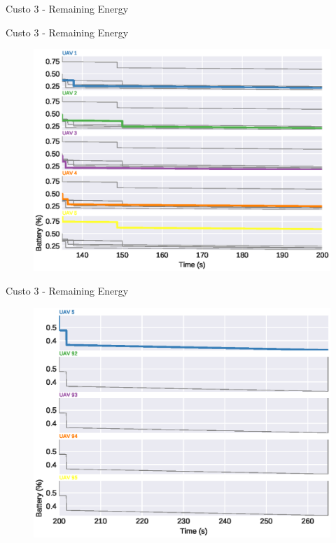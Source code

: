 \begin{frame}{Custo 3 - Remaining Energy}
                \end{frame}\begin{frame}{Custo 3 - Remaining Energy}
                    \begin{figure}[!htb]
                        \includegraphics[width=\textwidth]{custo_3/uav_remaining_energy_200.eps}
                    \end{figure}
                \end{frame}\begin{frame}{Custo 3 - Remaining Energy}
                    \begin{figure}[!htb]
                        \includegraphics[width=\textwidth]{custo_3/uav_remaining_energy_265.eps}

\end{figure}
\end{frame}
